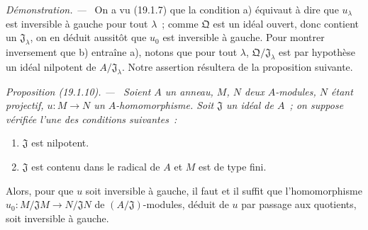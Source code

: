 \documentclass[10pt,oneside]{book}
\makeatletter
\newcommand{\setmanualcurrentlabel}[1]{\def\@currentlabel{#1}}
\newenvironment{proposition}[1][]{%
  \setmanualcurrentlabel{#1}\par\medskip\noindent\itshape Proposition (#1). ---\ }{\par}
\newenvironment{proof}{%
  \par\medskip\noindent\textit{Démonstration. ---\ }}{\par}
\makeatother
\begin{document}
\begin{proof}
On a vu (19.1.7) que la condition a) équivaut à dire que $u_\lambda$ est
inversible à gauche pour tout $\lambda$~; comme $\mathfrak Q$ est un idéal
ouvert, donc contient un $\mathfrak J_\lambda$, on en déduit aussitôt que
$u_0$ est inversible à gauche. Pour montrer inversement que b) entraîne a),
notons que pour tout $\lambda$, $\mathfrak Q/\mathfrak J_\lambda$ est par
hypothèse un idéal nilpotent de $A/\mathfrak J_\lambda$. Notre assertion
résultera de la proposition suivante.
\end{proof}

\begin{proposition}[19.1.10]
\label{0.19.1.10-fr}
Soient $A$ un anneau, $M$, $N$ deux $A$-modules, $N$ étant projectif,
$u:M\to N$ un $A$-homomorphisme. Soit $\mathfrak J$ un idéal de $A$~; on
suppose vérifiée l'une des conditions suivantes~:
\begin{enumerate}
  \item[(i)] $\mathfrak J$ est nilpotent.
  \item[(ii)] $\mathfrak J$ est contenu dans le radical de $A$ et $M$ est de
  type fini.
\end{enumerate}
Alors, pour que $u$ soit inversible à gauche, il faut et il suffit que
l'homomorphisme
$u_0:M/\mathfrak JM\to N/\mathfrak JN$ de $(A/\mathfrak J)$-modules, déduit
de $u$ par passage aux quotients, soit inversible à gauche.
\end{proposition}
\end{document}
